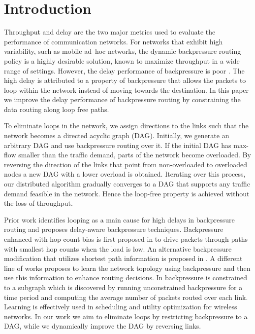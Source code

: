 \documentclass{sig-alternate-2013}
\begin{document}
\section{Introduction}
Throughput and delay are the two major  metrics used to evaluate the performance of communication networks.
For networks that exhibit high variability, such as mobile ad~hoc networks, the dynamic backpressure routing policy  \cite{tassiulas} 
is a highly desirable solution,  known to maximize  throughput in a wide range of settings. 
However,  the delay performance of backpressure is  poor \cite{srikant}.
 The high delay is attributed to  a property of  backpressure that allows the packets to loop within the network instead of moving towards the destination. 
 In this paper we  improve the delay performance of backpressure routing by constraining the data routing along loop free paths.

 
To eliminate  loops in the network, we assign directions to the links such that the network becomes a directed acyclic graph (DAG). 
Initially, we generate an  arbitrary DAG and use backpressure routing over it.
If the initial DAG has max-flow smaller than  the traffic demand, parts of the network become overloaded. 
By reversing the direction of the links that point from non-overloaded to overloaded nodes a new DAG with a lower overload is obtained. 
Iterating over this process, our distributed algorithm gradually converges to a DAG that supports any  traffic demand  feasible in the network. Hence the loop-free property is achieved without the loss of throughput.


Prior work  identifies  looping as a main cause for high delays in backpressure routing and proposes delay-aware backpressure techniques. 
Backpressure enhanced with hop count bias is first proposed  in \cite{neely_enhanced} to drive packets through  paths with smallest hop counts when the load is low.  
An alternative backpressure modification that utilizes shortest path information is proposed in \cite{ying}. 
A different line of works proposes to learn the network topology using backpressure and then use this information to enhance routing decisions. In \cite{atilla} backpressure is constrained to a subgraph which is discovered by running unconstrained backpressure for a time period and computing the average number of  packets routed over each link. Learning is  effectively used in scheduling \cite{huang} and utility optimization \cite{longbo} for wireless networks.
In our work we aim to eliminate loops by restricting backpressure to a DAG, while we dynamically improve the DAG by reversing links.
\end{document}
